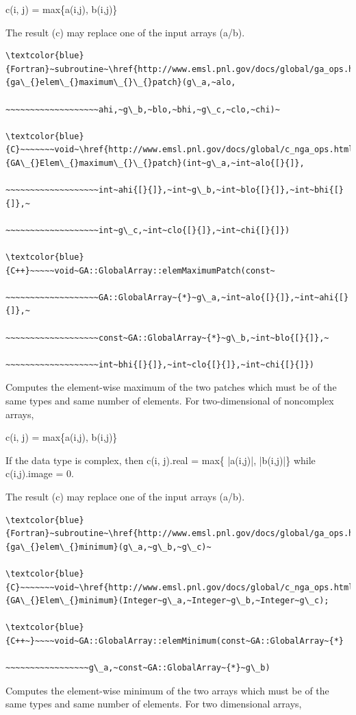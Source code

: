 c(i, j) = max\{a(i,j), b(i,j)\}

The result (c) may replace one of the input arrays (a/b). 
\begin{verbatim}
\textcolor{blue}{Fortran}~subroutine~\href{http://www.emsl.pnl.gov/docs/global/ga_ops.html\#ga_elem_maximum_patch}{ga\_{}elem\_{}maximum\_{}\_{}patch}(g\_a,~alo,

~~~~~~~~~~~~~~~~~~~ahi,~g\_b,~blo,~bhi,~g\_c,~clo,~chi)~

\textcolor{blue}{C}~~~~~~~void~\href{http://www.emsl.pnl.gov/docs/global/c_nga_ops.html\#ga_elem_maximum_patch}{GA\_{}Elem\_{}maximum\_{}\_{}patch}(int~g\_a,~int~alo{[}{]},

~~~~~~~~~~~~~~~~~~~int~ahi{[}{]},~int~g\_b,~int~blo{[}{]},~int~bhi{[}{]},~

~~~~~~~~~~~~~~~~~~~int~g\_c,~int~clo{[}{]},~int~chi{[}{]})

\textcolor{blue}{C++}~~~~~void~GA::GlobalArray::elemMaximumPatch(const~

~~~~~~~~~~~~~~~~~~~GA::GlobalArray~{*}~g\_a,~int~alo{[}{]},~int~ahi{[}{]},~

~~~~~~~~~~~~~~~~~~~const~GA::GlobalArray~{*}~g\_b,~int~blo{[}{]},~

~~~~~~~~~~~~~~~~~~~int~bhi{[}{]},~int~clo{[}{]},~int~chi{[}{]})
\end{verbatim}
Computes the element-wise maximum of the two patches which must be
of the same types and same number of elements. For two-dimensional
of noncomplex arrays,

c(i, j) = max\{a(i,j), b(i,j)\}

If the data type is complex, then c(i, j).real = max\{ |a(i,j)|, |b(i,j)|\}
while c(i,j).image = 0.

The result (c) may replace one of the input arrays (a/b). 
\begin{verbatim}
\textcolor{blue}{Fortran}~subroutine~\href{http://www.emsl.pnl.gov/docs/global/ga_ops.html\#ga_elem_minimum}{ga\_{}elem\_{}minimum}(g\_a,~g\_b,~g\_c)~

\textcolor{blue}{C}~~~~~~~void~\href{http://www.emsl.pnl.gov/docs/global/c_nga_ops.html\#ga_elem_minimum}{GA\_{}Elem\_{}minimum}(Integer~g\_a,~Integer~g\_b,~Integer~g\_c);

\textcolor{blue}{C++~}~~~~void~GA::GlobalArray::elemMinimum(const~GA::GlobalArray~{*}

~~~~~~~~~~~~~~~~~g\_a,~const~GA::GlobalArray~{*}~g\_b)
\end{verbatim}
Computes the element-wise minimum of the two arrays which must be
of the same types and same number of elements. For two dimensional
arrays,

